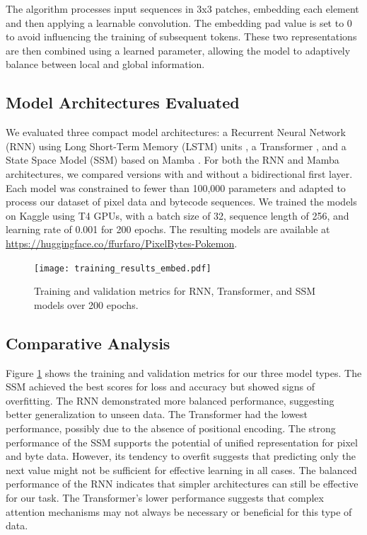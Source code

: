 \documentclass[10pt,a4paper]{article}
\begin{document}
The algorithm processes input sequences in 3x3 patches, embedding each element and then applying a learnable convolution. The embedding pad value is set to 0 to avoid influencing the training of subsequent tokens. These two representations are then combined using a learned parameter, allowing the model to adaptively balance between local and global information.

\subsection{Model Architectures Evaluated}

We evaluated three compact model architectures: a Recurrent Neural Network (RNN) using Long Short-Term Memory (LSTM) units \cite{schmidhuber1997long}, a Transformer \cite{vaswani2017attention}, and a State Space Model (SSM) based on Mamba \cite{gu2023mamba}. For both the RNN and Mamba architectures, we compared versions with and without a bidirectional first layer. Each model was constrained to fewer than 100,000 parameters and adapted to process our dataset of pixel data and bytecode sequences. We trained the models on Kaggle using T4 GPUs, with a batch size of 32, sequence length of 256, and learning rate of 0.001 for 200 epochs. The resulting models are available at \url{https://huggingface.co/ffurfaro/PixelBytes-Pokemon}.

\begin{figure}[ht]
\centering
\texttt{[image: training\_results\_embed.pdf]}
\caption{Training and validation metrics for RNN, Transformer, and SSM models over 200 epochs.}
\label{fig:training_results}
\end{figure}


\subsection{Comparative Analysis}

Figure \ref{fig:training_results} shows the training and validation metrics for our three model types. The SSM achieved the best scores for loss and accuracy but showed signs of overfitting. The RNN demonstrated more balanced performance, suggesting better generalization to unseen data. The Transformer had the lowest performance, possibly due to the absence of positional encoding. The strong performance of the SSM supports the potential of unified representation for pixel and byte data. However, its tendency to overfit suggests that predicting only the next value might not be sufficient for effective learning in all cases. The balanced performance of the RNN indicates that simpler architectures can still be effective for our task. The Transformer's lower performance suggests that complex attention mechanisms may not always be necessary or beneficial for this type of data.
\end{document}
